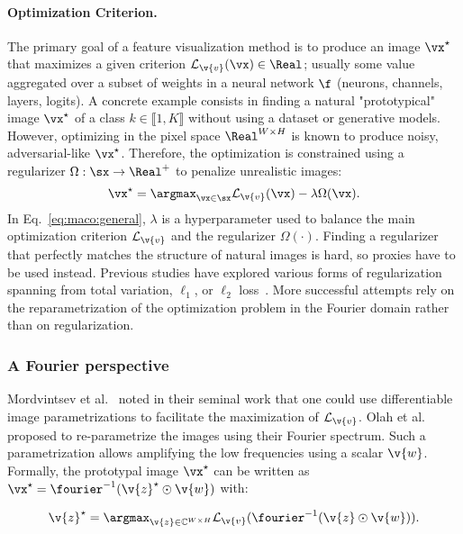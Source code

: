 \paragraph{Optimization Criterion.}
The primary goal of a feature visualization method is to produce an image $\vx^\star$ that maximizes a given criterion $\mathcal{L}_{\v{v}}(\vx) \in \Real$; usually some value aggregated over a subset of weights in a neural network $\f$ (neurons, channels, layers, logits).
A concrete example consists in finding a natural "prototypical" image $\vx^\star$ of a class $k \in \llbracket 1, K \rrbracket$ without using a dataset or generative models.
However, optimizing in the pixel space $\Real^{W \times H}$ is known to produce noisy, adversarial-like $\vx^\star$. Therefore, the optimization is constrained using a regularizer $\Omega: \sx \to \Real^+$ to penalize unrealistic images:
\begin{equation}
\vx^\star = \argmax_{\vx \in \sx} \mathcal{L}_{\v{v}}(\vx) - \lambda \Omega(\vx).
\label{eq:maco:general}
\end{equation}
In Eq.~\ref{eq:maco:general}, $\lambda$ is a hyperparameter used to balance the main optimization criterion $\mathcal{L}_{\v{v}}$ and the regularizer $\Omega(\cdot)$. Finding a regularizer that perfectly matches the structure of natural images is hard, so  proxies have to be used instead. Previous studies have explored various forms of regularization spanning from total variation, $\ell_1$, or $\ell_2$ loss~\cite{nguyen2016synthesizing,nguyen2017plug,simonyan2014deep}. More successful attempts rely on the reparametrization of the optimization problem in the Fourier domain rather than on regularization.


\subsubsection{A Fourier perspective}

Mordvintsev et al.~\cite{mordvintsev2018differentiable} noted in their seminal work that one could use differentiable image parametrizations to facilitate the maximization of $\mathcal{L}_{\v{v}}$. Olah et al.~\cite{olah2017feature} proposed to re-parametrize the images using their Fourier spectrum. Such a parametrization allows amplifying the low frequencies using a scalar $\v{w}$. Formally, the prototypal image $\vx^\star$ can be written as $\vx^\star = \fourier^{-1}(\v{z}^\star \odot \v{w})$ with:

$$ \v{z}^\star = \argmax_{\v{z} \in \mathbb{C}^{W \times H}} \mathcal{L}_{\v{v}}(\fourier^{-1}(\v{z} \odot \v{w})).$$

